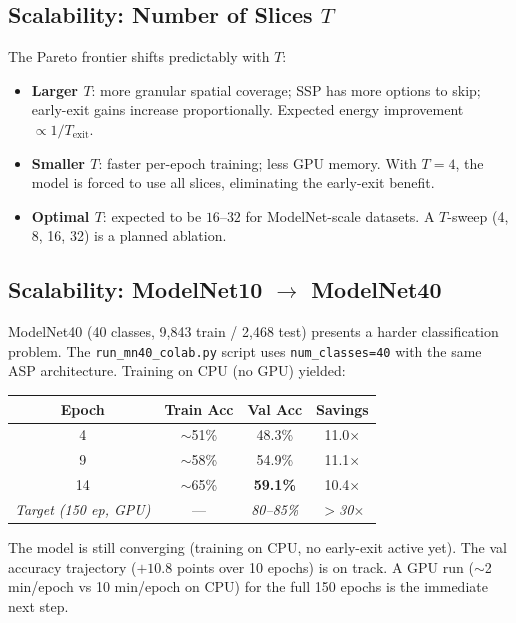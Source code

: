 \documentclass[11pt,a4paper]{article}
\begin{document}
\subsection{Scalability: Number of Slices $T$}

The Pareto frontier shifts predictably with $T$:
\begin{itemize}
  \item \textbf{Larger $T$}: more granular spatial coverage; SSP has more options to skip;
        early-exit gains increase proportionally. Expected energy improvement $\propto 1/T_{\text{exit}}$.
  \item \textbf{Smaller $T$}: faster per-epoch training; less GPU memory. With $T=4$,
        the model is forced to use all slices, eliminating the early-exit benefit.
  \item \textbf{Optimal $T$}: expected to be $16$--$32$ for ModelNet-scale datasets.
        A $T$-sweep (4, 8, 16, 32) is a planned ablation.
\end{itemize}

\subsection{Scalability: ModelNet10 $\to$ ModelNet40}

ModelNet40 (40 classes, 9{,}843 train / 2{,}468 test) presents a harder classification problem.
The \texttt{run\_mn40\_colab.py} script uses \texttt{num\_classes=40} with the same ASP architecture.
Training on CPU (no GPU) yielded:

\begin{center}
\begin{tabular}{cccc}
\toprule
\textbf{Epoch} & \textbf{Train Acc} & \textbf{Val Acc} & \textbf{Savings} \\
\midrule
4 & $\sim$51\% & 48.3\% & 11.0$\times$ \\
9 & $\sim$58\% & 54.9\% & 11.1$\times$ \\
14 & $\sim$65\% & \textbf{59.1\%} & 10.4$\times$ \\
\midrule
\textit{Target (150 ep, GPU)} & --- & \textit{80--85\%} & \textit{$>$30$\times$} \\
\bottomrule
\end{tabular}
\end{center}

The model is still converging (training on CPU, no early-exit active yet). The val accuracy
trajectory ($+10.8$ points over 10 epochs) is on track. A GPU run ($\sim$2 min/epoch vs 10 min/epoch
on CPU) for the full 150 epochs is the immediate next step.
\end{document}
